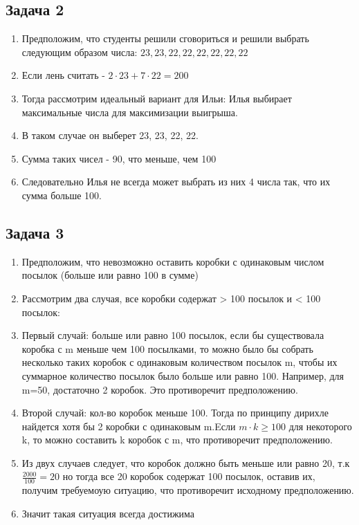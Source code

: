\documentclass[a4paper,12pt]{article}
\begin{document}
\subsection{Задача 2}
\begin{enumerate}
    \item Предположим, что студенты решили сговориться и решили выбрать следующим образом числа: $23, 23, 22, 22, 22, 22, 22, 22$
    \item Если лень считать - $2\cdot23 + 7\cdot22 = 200$
    \item Тогда рассмотрим идеальный вариант для Ильи: Илья выбирает максимальные числа для максимизации выигрыша.
    \item В таком случае он выберет 23, 23, 22, 22.
    \item Сумма таких чисел - 90, что меньше, чем 100
    \item Следовательно Илья не всегда может выбрать из них 4 числа так, что их сумма больше 100.
\end{enumerate}

\subsection{Задача 3}
\begin{enumerate}
    \item Предположим, что невозможно оставить коробки с одинаковым числом посылок (больше или равно 100 в сумме)
    \item Рассмотрим два случая, все коробки содержат > 100 посылок и < 100 посылок:
    \item Первый случай: больше или равно 100 посылок, если бы существовала коробка с m меньше чем 100 посылками, то можно было бы собрать несколько таких коробок с одинаковым количеством посылок m, чтобы их суммарное количество посылок было больше или равно 100. Например, для m=50, достаточно 2 коробок. Это противоречит предположению.
    \item Второй случай: кол-во коробок меньше 100. Тогда по принципу дирихле найдется хотя бы 2 коробки с одинаковым m.Eсли $m\cdot k \ge 100$ для некоторого k, то можно составить k коробок с m, что противоречит предположению.
    \item Из двух случаев следует, что коробок должно быть меньше или равно 20, т.к $\frac{2000}{100}=20$ но тогда все 20 коробок содержат 100 посылок, оставив их, получим требуемоую ситуацию, что противоречит исходному предположению. 
    \item Значит такая ситуация всегда достижима
\end{enumerate}
\end{document}
